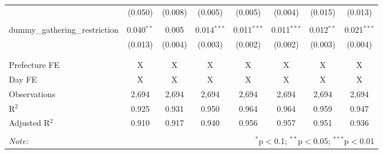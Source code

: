 \begin{table}[!htbp]
\begin{tabular}{@{\extracolsep{-15pt}}lccccccc}
  & (0.050) & (0.008) & (0.005) & (0.005) & (0.004) & (0.015) & (0.013) \\ 
  & & & & & & & \\ 
 dummy\_gathering\_restriction & 0.040$^{**}$ & 0.005 & 0.014$^{***}$ & 0.011$^{***}$ & 0.011$^{***}$ & 0.012$^{**}$ & 0.021$^{***}$ \\ 
  & (0.013) & (0.004) & (0.003) & (0.002) & (0.002) & (0.003) & (0.004) \\ 
  & & & & & & & \\ 
\hline \\[-1.8ex] 
Prefecture FE & X & X & X & X & X & X & X \\ 
Day FE & X & X & X & X & X & X & X \\ 
Observations & 2,694 & 2,694 & 2,694 & 2,694 & 2,694 & 2,694 & 2,694 \\ 
R$^{2}$ & 0.925 & 0.931 & 0.950 & 0.964 & 0.964 & 0.959 & 0.947 \\ 
Adjusted R$^{2}$ & 0.910 & 0.917 & 0.940 & 0.956 & 0.957 & 0.951 & 0.936 \\ 
\hline 
\hline \\[-1.8ex] 
\textit{Note:}  & \multicolumn{7}{r}{$^{*}$p$<$0.1; $^{**}$p$<$0.05; $^{***}$p$<$0.01} \\ 
\end{tabular} 
\end{table} 
